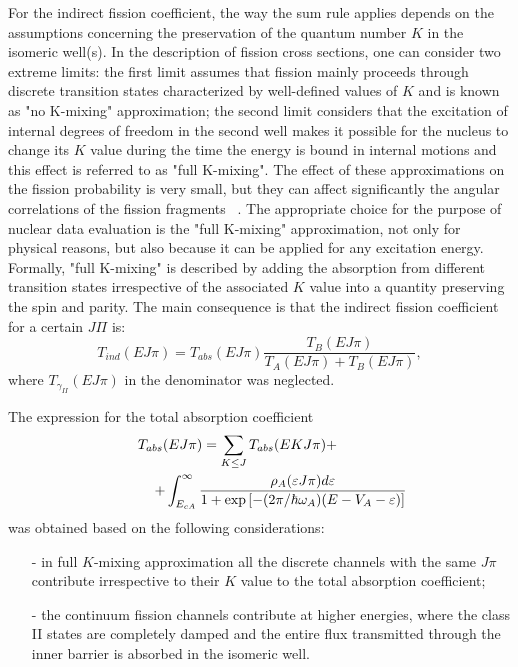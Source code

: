 For the indirect fission coefficient, the way the sum rule applies depends
on the assumptions concerning the preservation of the quantum number $K$ in
the isomeric well(s). In the description of fission cross sections, one can
consider two extreme limits: the first limit assumes that fission mainly
proceeds through discrete transition states characterized by well-defined
values of $K$ and is known as "no K-mixing" approximation; the second limit
considers that the excitation of internal degrees of freedom in the second
well makes it possible for the nucleus to change its $K$ value during the
time the energy is bound in internal motions and this effect is referred to
as "full K-mixing". The effect of these approximations on the fission
probability is very small, but they can affect significantly the angular
correlations of the fission fragments ~\cite{Back:74}. The appropriate
choice for the purpose of nuclear data evaluation is the "full K-mixing"
approximation, not only for physical reasons, but also because it can be
applied for any excitation energy. Formally, "full K-mixing" is described by
adding the absorption from different transition states irrespective of the
associated $K$ value into a quantity preserving the spin and parity. The
main consequence is that the indirect fission coefficient for a certain $%
J\Pi $ is: 
\begin{equation}
T_{ind}(E J \pi)=T_{abs}(E J \pi)\frac{T_{B}(E J \pi)}{T_{A}(E J
\pi)+T_{B}(E J \pi)},  \label{tind1}
\end{equation}
where $T_{\gamma_{II}}(E J \pi)$ in the denominator was neglected.

The expression for the total absorption coefficient 
\begin{eqnarray}
T_{abs}(EJ\pi)=\sum_{K\le J}T_{abs}(EKJ\pi) +\qquad\qquad\quad  \notag \\
\quad\qquad + \int_{E_{cA}}^{\infty} \frac {\rho_{A}(\varepsilon
J\pi)d\varepsilon} {1+\exp\left[ -(2\pi/\hbar\omega_{A})
(E-V_{A}-\varepsilon)\right] }  \label{tabst}
\end{eqnarray}
was obtained based on the following considerations:

\begin{itemize}
\item[-] in full $K$-mixing approximation all the discrete channels with the
same $J\pi$ contribute irrespective to their $K$ value to the total
absorption coefficient;

\item[-] the continuum fission channels contribute at higher energies, where
the class II states are completely damped and the entire flux transmitted
through the inner barrier is absorbed in the isomeric well.
\end{itemize}

